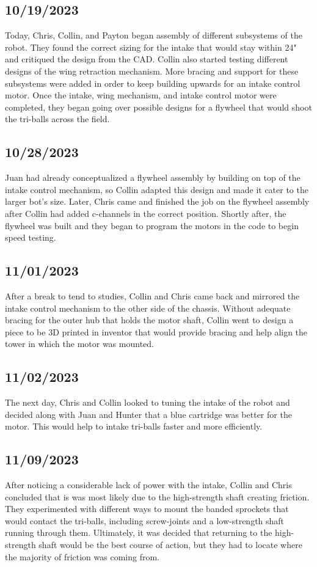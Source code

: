 \subsection{10/19/2023}
Today, Chris, Collin, and Payton began assembly of different subsystems of the robot. They found the correct sizing for the intake that would stay within 24" and critiqued the design from the CAD.
Collin also started testing different designs of the wing retraction mechanism. More bracing and support for these subsystems were added in order to keep building upwards for an intake control motor. Once the intake, wing mechanism, and intake control motor were completed, they began going over possible designs for a flywheel that would shoot the tri-balls across the field.

\subsection{10/28/2023}
Juan had already conceptualized a flywheel assembly by building on top of the intake control mechanism, so Collin adapted this design and made it cater to the larger bot's size. Later, Chris came and finished the job on the 
flywheel assembly after Collin had added c-channels in the correct position. Shortly after, the flywheel was built and they began to program the motors in the code to begin speed testing.
\subsection{11/01/2023}
After a break to tend to studies, Collin and Chris came back and mirrored the intake control mechanism to the other side of the chassis. Without adequate bracing for the outer hub that holds the motor shaft, Collin went to design a piece to be 3D printed in inventor that would provide bracing and help align the tower in which the motor was mounted.
\subsection{11/02/2023}
The next day, Chris and Collin looked to tuning the intake of the robot and decided along with Juan and Hunter that a blue cartridge was better for the motor. This would help to intake tri-balls faster and more efficiently.
\subsection{11/09/2023}
After noticing a considerable lack of power with the intake, Collin and Chris concluded that is was most likely due to the high-strength shaft creating friction. They experimented with different ways to mount the banded sprockets
that would contact the tri-balls, including screw-joints and a low-strength shaft running through them. Ultimately, it was decided that returning to the high-strength shaft would be the best course of action, but they had to 
locate where the majority of friction was coming from.
